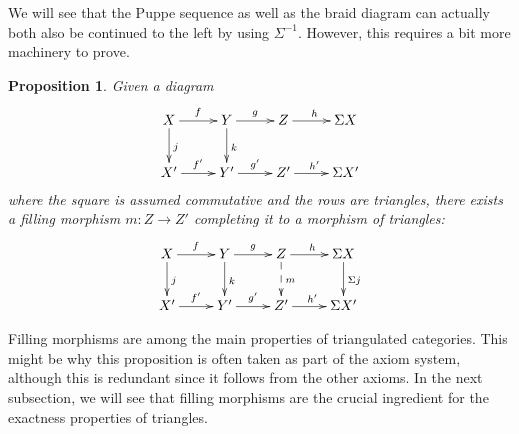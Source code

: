 \documentclass{amsproc}
\newtheorem{prop}{Proposition}[section]
\theoremstyle{definition}
\begin{document}
We will see that the Puppe sequence as well as the braid diagram can actually both also be continued to the left by using $\Sigma^{-1}$. However, this requires a bit more machinery to prove.

\begin{prop}
\label{fillingmorphism}
Given a diagram
\begin{displaymath}
\xymatrix{X\ar[r]^f\ar[d]^j & Y\ar[r]^g\ar[d]^k & Z\ar[r]^h & {}\Sigma X\\
X'\ar[r]^{f'} & Y'\ar[r]^{g'} & Z'\ar[r]^{h'} & \Sigma X'}
\end{displaymath}
where the square is assumed commutative and the rows are triangles, there exists a \emph{filling morphism} $m:Z{\longrightarrow} Z'$ completing it to a morphism of triangles:
\begin{displaymath}
\xymatrix{X\ar[r]^f\ar[d]^j & Y\ar[r]^g\ar[d]^k & Z\ar[r]^h\ar@{-->}[d]^m & {}\Sigma X\ar[d]^{\Sigma j}\\
X'\ar[r]^{f'} & Y'\ar[r]^{g'} & Z'\ar[r]^{h'} & {}\Sigma X'}
\end{displaymath}
\end{prop}

Filling morphisms are among the main properties of triangulated categories. This might be why this proposition is often taken as part of the axiom system, although this is redundant since it follows from the other axioms. In the next subsection, we will see that filling morphisms are the crucial ingredient for the exactness properties of triangles.
\end{document}
